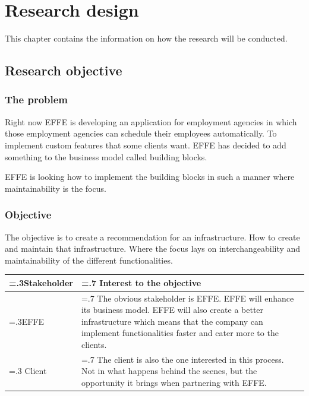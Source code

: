 
\chapter{Research design}
This chapter contains the information on how the research will be conducted.

\section{Research objective}

\subsection{The problem}
\label{sec:TheProblem}

Right now EFFE is developing an application for employment agencies in which those employment agencies can schedule their employees automatically. To implement custom features that some clients want. EFFE has decided to add something to the business model called building blocks.


EFFE is looking how to implement the building blocks in such a manner where maintainability is the focus.

\subsection{Objective}
The objective is to create a recommendation for an infrastructure. How to create and maintain that infrastructure. Where the focus lays on interchangeability and maintainability of the different functionalities.

\begin{tabularx}{\linewidth}{|>{\hsize=.3\hsize}X|>{\hsize=.7\hsize}X|}
	\hline
	Stakeholder &
	Interest to the objective
	\\
	\hline
	EFFE &
	The obvious stakeholder is EFFE. EFFE will enhance its business model. EFFE will also create a better infrastructure which means that the company can implement functionalities faster and cater more to the clients.
	\\
	\hline
	Client &
	The client is also the one interested in this process. Not in what happens behind the scenes, but the opportunity it brings when partnering with EFFE.
	\\
	\hline
\end{tabularx}

